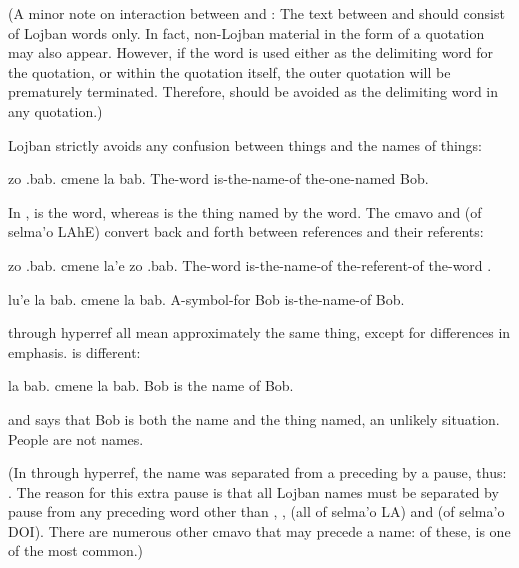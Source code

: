 (A minor note on interaction between  and
    : The text between  and  should consist
    of Lojban words only. In fact, non-Lojban material in the form
    of a  quotation may also appear. However, if the word
     is used either as the delimiting word for the 
    quotation, or within the quotation itself, the outer 
    quotation will be prematurely terminated. Therefore, 
    should be avoided as the delimiting word in any 
    quotation.) 

Lojban strictly avoids any confusion between things and the
    names of things:
\begin{example}
zo .bab. cmene la bab.\n
The-word  is-the-name-of the-one-named Bob.
\end{example}

In ,  is the word,
    whereas  is the thing named by the word. The cmavo
     and  (of selma'o LAhE) convert back and forth
    between references and their referents:
\begin{example}
zo .bab. cmene la'e zo .bab.\n
The-word  is-the-name-of\n
\T	the-referent-of the-word .
\end{example}

\begin{example}
lu'e la bab. cmene la bab.\n
A-symbol-for Bob is-the-name-of Bob.
\end{example}

 through hyperref all mean approximately the same thing,
    except for differences in emphasis.  is different:
\begin{example}
la bab. cmene la bab.\n
Bob is the name of Bob.
\end{example}

{\noindent}and says that Bob is both the name and the thing named, an
    unlikely situation. People are not names. 

(In  through hyperref, the name  was separated from a
    preceding  by a pause, thus: . The reason for
    this extra pause is that all Lojban names must be separated by
    pause from any preceding word other than , ,
     (all of selma'o LA) and  (of selma'o DOI).
    There are numerous other cmavo that may precede a name: of
    these,  is one of the most common.)

